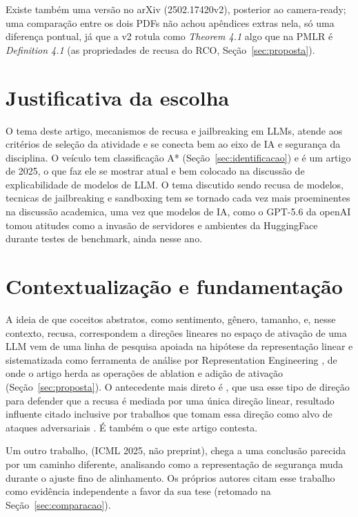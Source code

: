 \documentclass[article,11pt,oneside,a4paper,brazil,section=TITLE]{setup/abntex2}
\begin{document}
Existe também uma versão no arXiv (2502.17420v2), posterior ao camera-ready; uma comparação entre os dois PDFs não achou apêndices extras nela, só uma diferença pontual, já que a v2 rotula como \emph{Theorem 4.1} algo que na PMLR é \emph{Definition 4.1} (as propriedades de recusa do RCO, Seção~\ref{sec:proposta}).

\section{Justificativa da escolha}

O tema deste artigo, mecanismos de recusa e jailbreaking em LLMs, atende aos critérios de seleção da atividade e se conecta bem ao eixo de IA e segurança da disciplina. O veículo tem classificação A* (Seção~\ref{sec:identificacao}) e é um artigo de 2025, o que faz ele se mostrar atual e bem colocado na discussão de explicabilidade de modelos de LLM. O tema discutido sendo recusa de modelos, tecnicas de jailbreaking e sandboxing tem se tornado cada vez mais proeminentes na discussão academica, uma vez que modelos de IA, como o GPT-5.6 da openAI tomou atitudes como a invasão de servidores e ambientes da HuggingFace durante testes de benchmark, ainda nesse ano.

\section{Contextualização e fundamentação}

A ideia de que coceitos abstratos, como sentimento, gênero, tamanho, e, nesse contexto, recusa, correspondem a direções lineares no espaço de ativação de uma LLM vem de uma linha de pesquisa apoiada na hipótese da representação linear \parencite{park2023linear} e sistematizada como ferramenta de análise por Representation Engineering \parencite{zou2023representation}, de onde o artigo herda as operações de ablation e adição de ativação (Seção~\ref{sec:proposta}). O antecedente mais direto é \textcite{arditi2024refusal}, que usa esse tipo de direção para defender que a recusa é mediada por uma única direção linear, resultado influente citado inclusive por trabalhos que tomam essa direção como alvo de ataques adversariais \parencite{yu2024robust}. É também o que este artigo contesta.

Um outro trabalho, \textcite{pan2025hidden} (ICML 2025, não preprint), chega a uma conclusão parecida por um caminho diferente, analisando como a representação de segurança muda durante o ajuste fino de alinhamento. Os próprios autores citam esse trabalho como evidência independente a favor da sua tese (retomado na Seção~\ref{sec:comparacao}).
\end{document}
